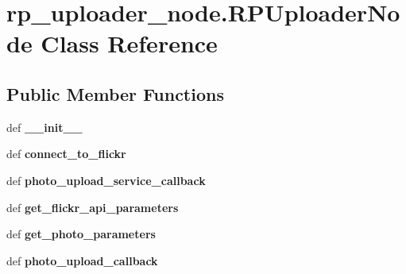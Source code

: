 \hypertarget{classrp__uploader__node_1_1_r_p_uploader_node}{\section{rp\-\_\-uploader\-\_\-node.\-R\-P\-Uploader\-Node \-Class \-Reference}
\label{classrp__uploader__node_1_1_r_p_uploader_node}
}
\subsection*{\-Public \-Member \-Functions}
\begin{DoxyCompactItemize}
\item 
\hypertarget{classrp__uploader__node_1_1_r_p_uploader_node_a1c1ce605db8fdb40ead48a4778401eef}{def {\bfseries \-\_\-\-\_\-init\-\_\-\-\_\-}}\label{classrp__uploader__node_1_1_r_p_uploader_node_a1c1ce605db8fdb40ead48a4778401eef}

\item 
\hypertarget{classrp__uploader__node_1_1_r_p_uploader_node_ac46aeea65a135dec59384399d3b99c32}{def {\bfseries connect\-\_\-to\-\_\-flickr}}\label{classrp__uploader__node_1_1_r_p_uploader_node_ac46aeea65a135dec59384399d3b99c32}

\item 
\hypertarget{classrp__uploader__node_1_1_r_p_uploader_node_a4819540e489b52cfff4897e76407a60a}{def {\bfseries photo\-\_\-upload\-\_\-service\-\_\-callback}}\label{classrp__uploader__node_1_1_r_p_uploader_node_a4819540e489b52cfff4897e76407a60a}

\item 
\hypertarget{classrp__uploader__node_1_1_r_p_uploader_node_abaafa0917533578be81555e023bf4b61}{def {\bfseries get\-\_\-flickr\-\_\-api\-\_\-parameters}}\label{classrp__uploader__node_1_1_r_p_uploader_node_abaafa0917533578be81555e023bf4b61}

\item 
\hypertarget{classrp__uploader__node_1_1_r_p_uploader_node_a0be4aa491fe44955e246e40e1bb0de4c}{def {\bfseries get\-\_\-photo\-\_\-parameters}}\label{classrp__uploader__node_1_1_r_p_uploader_node_a0be4aa491fe44955e246e40e1bb0de4c}

\item 
\hypertarget{classrp__uploader__node_1_1_r_p_uploader_node_a3824cfbe76f061a6a46bf02e6b523c2c}{def {\bfseries photo\-\_\-upload\-\_\-callback}}\label{classrp__uploader__node_1_1_r_p_uploader_node_a3824cfbe76f061a6a46bf02e6b523c2c}

\end{DoxyCompactItemize}

